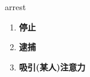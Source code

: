 
\begin{frame}
{\huge arrest}
\begin{center}
\begin{enumerate}\Large
  \item \textbf{停止}
  \item \textbf{逮捕}
  \item \textbf{吸引(某人)注意力}
\end{enumerate}
\end{center}
\end{frame}
